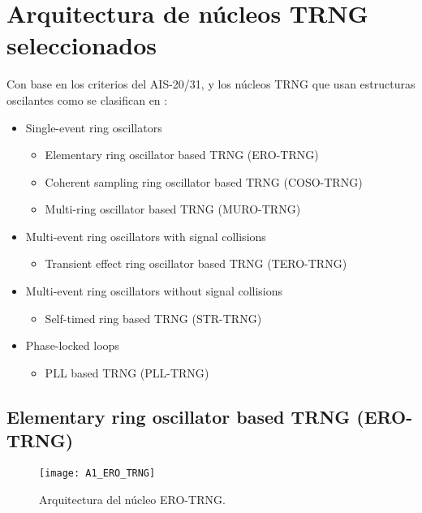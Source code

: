 	
	
	\section{Arquitectura de núcleos TRNG seleccionados}

	Con base en los criterios del AIS-20/31, y los núcleos \gls{TRNG} que usan estructuras oscilantes como se clasifican en \cite{Petura2016}:
	
	\begin{itemize}
		\item Single-event ring oscillators
			\begin{itemize}
				\item Elementary ring oscillator based TRNG (\gls{ERO-TRNG})
				\item Coherent sampling ring oscillator based TRNG (\gls{COSO-TRNG})
				\item Multi-ring oscillator based TRNG (\gls{MURO-TRNG})
			\end{itemize}
		\item Multi-event ring oscillators with signal collisions
			\begin{itemize}
				\item Transient effect ring oscillator based TRNG (\gls{TERO-TRNG})
			\end{itemize}
		\item Multi-event ring oscillators without signal collisions
			\begin{itemize}
				\item Self-timed ring based TRNG (\gls{STR-TRNG})
			\end{itemize}
		\item Phase-locked loops
			\begin{itemize}
				\item PLL based TRNG (\gls{PLL-TRNG})
			\end{itemize}
	\end{itemize}
	
		\subsection{Elementary ring oscillator based TRNG (ERO-TRNG)}
		
					
				\begin{figure}[hbtp]
					\caption{Arquitectura del núcleo ERO-TRNG.}
					\centering
					\texttt{[image: A1\_ERO\_TRNG]}
					\label{fig:A1_ERO_TRNG}
				\end{figure}
			
